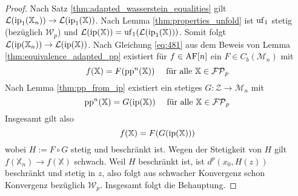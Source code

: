     \begin{proof}
        Nach Satz \ref{thm:adapted_wasserstein_equalities} gilt $\mathcal{L}(\operatorname{ip}_1(\mathbb{X}_n)) \rightarrow \mathcal{L}(\operatorname{ip}_1(\mathbb{X}))$. Nach Lemma \ref{thm:properties_unfold} ist $\operatorname{uf}_1$ stetig (bezüglich $\mathcal{W}_p$) und $\mathcal{L}(\operatorname{ip}(\mathbb{X})) = \operatorname{uf}_1(\mathcal{L}(\operatorname{ip}_1(\mathbb{X})))$. Somit folgt $\mathcal{L}(\operatorname{ip}(\mathbb{X}_n)) \rightarrow \mathcal{L}(\operatorname{ip}(\mathbb{X}))$. Nach Gleichung \ref{eq:481} aus dem Beweis von Lemma \ref{thm:equivalence_adapted_pp} existiert für $f \in \operatorname{AF}[n]$ ein $F \in C_b(\mathcal{M}_n)$ mit 
        $$f(\mathbb{X}) = F(\operatorname{pp}^n(\mathbb{X})) \quad \text{ für alle } \mathbb{X} \in \mathcal{FP}_p$$
        Nach Lemma \ref{thm:pp_from_ip} existiert ein stetiges $G: \mathcal{Z}\rightarrow \mathcal{M}_n$ mit 
        $$\operatorname{pp}^n(\mathbb{X}) = G(\operatorname{ip}(\mathbb{X})) \quad \text{ für alle } \mathbb{X} \in \mathcal{FP}_p$$
        Insgesamt  gilt also
        $$f(\mathbb{X}) = F(G(\operatorname{ip}(\mathbb{X})))$$
        wobei $H:=F\circ G$ stetig und beschränkt ist. Wegen der Stetigkeit von $H$ gilt $f(\mathbb{X}_n) \rightarrow f(\mathbb{X})$ schwach. Weil $H$ beschränkt ist, ist $d^p(x_0, H(z))$ beschränkt und stetig in $z$, also folgt aus schwacher Konvergenz schon Konvergenz bezüglich $\mathcal{W}_p$. Insgesamt folgt die Behauptung. 

    \end{proof}
